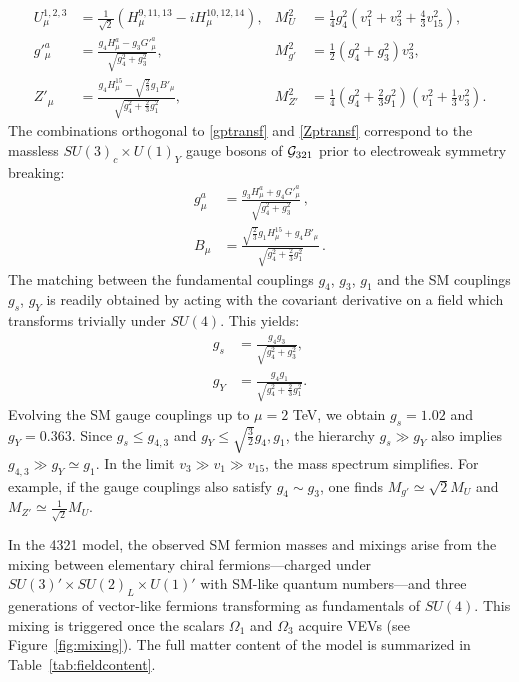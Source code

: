 \begin{align}
  U_\mu^{1,2,3} 
    &= \frac{1}{\sqrt{2}} \left( H^{9,11,13}_\mu \!\!\!- i H^{10,12,14}_\mu \right), 
  &
  M^2_{U} 
    &= \frac{1}{4} g_4^2 \left(v_1^2 + v_3^2 + \frac{4}{3} v_{15}^2\right), \label{defU} \\
  g'^a_\mu 
    &= \frac{g_4 H^a_\mu - g_3 G'^a_\mu}{\sqrt{g_4^2 + g_3^2}},
  &
  M^2_{g'} 
    &= \frac{1}{2}  (g_4^2 + g_3^2) v_3^2,\label{gptransf}\\
  Z'_\mu 
    &= \frac{g_4 H^{15}_\mu - \sqrt{\frac{2}{3}} g_1 B'_\mu}{\sqrt{g_4^2 + \frac{2}{3} g_1^2}},
  &
  M^2_{Z'} 
    &= \frac{1}{4} \left( g_4^2 + \frac{2}{3} g_1^2 \right) \left(v_1^2 + \frac{1}{3} v_3^2 \right). \label{Zptransf}
\end{align}
The combinations orthogonal to \eqref{gptransf} and \eqref{Zptransf}
correspond to the massless $SU(3)_c \times U(1)_Y$ gauge bosons of $\mathcal{G}_{\rm 321}$ 
prior to electroweak symmetry breaking:
\begin{align}
\label{gtransf} 
g^a_\mu &= \frac{g_3 H^a_\mu + g_4 G'^a_\mu}{\sqrt{g_4^2 + g_3^2}} \, , \\
\label{Btransf} 
B_\mu &= \frac{\sqrt{\frac{2}{3}} g_1 H^{15}_\mu + g_4 B'_\mu}{\sqrt{g_4^2 + \frac{2}{3} g_1^2}} \, .
\end{align}
The matching between the fundamental couplings $g_4$, $g_3$, $g_1$ and the SM couplings $g_s$, $g_Y$ is readily obtained by acting with the covariant derivative on a field which transforms trivially under $SU(4)$. This yields:
\begin{align}
\label{matchinggsgs}
g_s &= \frac{g_4 g_3}{\sqrt{g_4^2 + g_3^2}}, 
\\ 
\label{matchinggsgY}
g_Y &= \frac{g_4 g_1}{\sqrt{g_4^2 + \frac{2}{3} g_1^2}}.
\end{align}
Evolving the SM gauge couplings up to $\mu=2$ TeV, we obtain 
$g_s = 1.02$ and $g_Y = 0.363$. 
Since $g_s \leq g_{4,3}$ and $g_Y \leq \sqrt{\tfrac{3}{2}} g_{4}, g_{1}$,  
the hierarchy $g_s \gg g_Y$ also implies $g_{4,3} \gg g_Y \simeq g_1$. 
In the limit $v_3 \gg v_1 \gg v_{15}$, the mass spectrum simplifies. For example, if the gauge couplings also satisfy $g_4 \sim g_3$, one finds $M_{g'} \simeq \sqrt{2} M_U$ and $M_{Z'} \simeq \tfrac{1}{\sqrt{2}} M_U$.

In the 4321 model, the observed SM fermion masses and mixings arise from the mixing between elementary chiral fermions—charged under $SU(3)' \times SU(2)_L \times U(1)'$ with SM-like quantum numbers—and three generations of vector-like fermions transforming as fundamentals of $SU(4)$. This mixing is triggered once the scalars $\Omega_{1}$ and $\Omega_{3}$ acquire VEVs (see Figure~\ref{fig:mixing}). The full matter content of the model is summarized in Table~\ref{tab:fieldcontent}.

